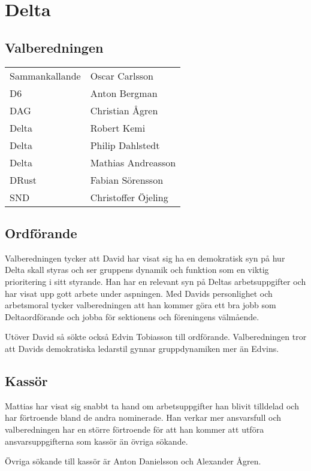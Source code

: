 \section{Delta}

\subsection{Valberedningen}
\begin{autoframe}

\begin{tabular}{ll}
Sammankallande & Oscar Carlsson \\
D6 & Anton Bergman \\
DAG  & Christian Ågren \\
Delta  & Robert Kemi \\
Delta  & Philip Dahlstedt \\
Delta  & Mathias Andreasson \\
DRust & Fabian Sörensson \\
SND  & Christoffer Öjeling
\end{tabular}

\end{autoframe}

\subsection{Ordförande}
\begin{autoframe}

Valberedningen tycker att David har visat sig ha en demokratisk syn på hur Delta skall styras och ser gruppens dynamik och funktion som en viktig prioritering i sitt styrande. Han har en relevant syn på Deltas arbetsuppgifter och har visat upp gott arbete under aspningen. Med Davids personlighet och arbetsmoral tycker valberedningen att han kommer göra ett bra jobb som Deltaordförande och jobba för sektionens och föreningens välmående.
\bigskip

Utöver David så sökte också Edvin Tobiasson till ordförande. Valberedningen tror att Davids demokratiska ledarstil gynnar gruppdynamiken mer än Edvins.
\end{autoframe}

\subsection{Kassör}
\begin{autoframe}

Mattias har visat sig snabbt ta hand om arbetsuppgifter han blivit tilldelad och har förtroende bland de andra nominerade. Han verkar mer ansvarsfull och valberedningen har en större förtroende för att han kommer att utföra ansvarsuppgifterna som kassör än övriga sökande.

\bigskip
Övriga sökande till kassör är Anton Danielsson och Alexander Ågren.
\end{autoframe}

